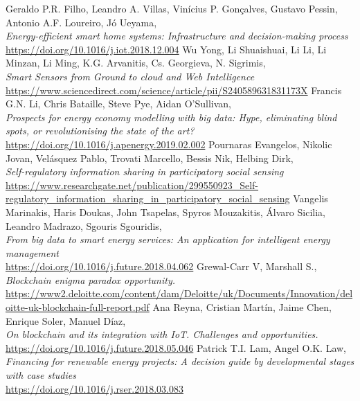 \documentclass[11pt]{article}
\begin{document}
\begin{thebibliography}{22}
	Geraldo P.R. Filho, Leandro A. Villas, Vinícius P. Gonçalves, Gustavo Pessin, Antonio A.F. Loureiro, Jó Ueyama, \\
	\textit{Energy-efficient smart home systems: Infrastructure
		and decision-making process}\\
	\hyperref[https://doi.org/10.1016/j.iot.2018.12.004]{https://doi.org/10.1016/j.iot.2018.12.004}
	Wu Yong, Li Shuaishuai, Li Li, Li Minzan, Li Ming, K.G. Arvanitis, Cs. Georgieva, N. Sigrimis, \\
	\textit{Smart Sensors from Ground to cloud and Web Intelligence}\\
	\hyperref[https://www.sciencedirect.com/science/article/pii/S240589631831173X]{https://www.sciencedirect.com/science/article/pii/S240589631831173X}
	Francis G.N. Li, Chris Bataille, Steve Pye, Aidan O'Sullivan, \\
	\textit{Prospects for energy economy modelling with big data: Hype, eliminating blind spots, or revolutionising the state of the art?}\\
	\hyperref[https://doi.org/10.1016/j.apenergy.2019.02.002]{https://doi.org/10.1016/j.apenergy.2019.02.002}
	Pournaras Evangelos, Nikolic Jovan, Velásquez Pablo, Trovati Marcello, Bessis Nik, Helbing Dirk, \\
	\textit{Self-regulatory information sharing in participatory social sensing}\\
	\hyperref[https://www.researchgate.net/publication/299550923_Self-regulatory_information_sharing_in_participatory_social_sensing]{https://www.researchgate.net/publication/299550923\_Self-regulatory\_information\_sharing\_in\_participatory\_social\_sensing}
	Vangelis Marinakis, Haris Doukas, John Tsapelas, Spyros Mouzakitis, Álvaro Sicilia, Leandro Madrazo, Sgouris Sgouridis, \\
	\textit{From big data to smart energy services: An application for intelligent energy management}\\
	\hyperref[https://doi.org/10.1016/j.future.2018.04.062]{https://doi.org/10.1016/j.future.2018.04.062}
	Grewal-Carr V, Marshall S., \\
	\textit{Blockchain enigma paradox opportunity.}\\
	\hyperref[https://www2.deloitte.com/content/dam/Deloitte/uk/Documents/Innovation/deloitte-uk-blockchain-full-report.pdf]{https://www2.deloitte.com/content/dam/Deloitte/uk/Documents/Innovation/deloitte-uk-blockchain-full-report.pdf}
	Ana Reyna, Cristian Martín, Jaime Chen, Enrique Soler, Manuel Díaz, \\
	\textit{On blockchain and its integration with IoT. Challenges and opportunities.}\\
	\hyperref[https://doi.org/10.1016/j.future.2018.05.046]{https://doi.org/10.1016/j.future.2018.05.046}
	Patrick T.I. Lam, Angel O.K. Law, \\
	\textit{Financing for renewable energy projects: A decision guide by developmental stages with case studies}\\
	\hyperref[https://doi.org/10.1016/j.rser.2018.03.083]{https://doi.org/10.1016/j.rser.2018.03.083}


\end{thebibliography}

	
\end{document}

